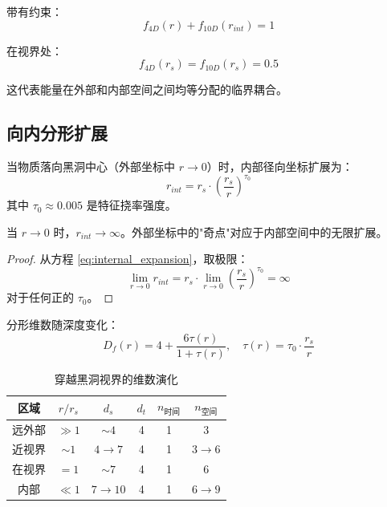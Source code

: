 带有约束：
\begin{equation}
    f_{4D}(r) + f_{10D}(r_{int}) = 1
\end{equation}

在视界处：
\begin{equation}
    f_{4D}(r_s) = f_{10D}(r_s) = 0.5
    \label{eq:horizon_energy_equipartition}
\end{equation}

这代表能量在外部和内部空间之间均等分配的临界耦合。

\subsection{向内分形扩展}

\begin{theorem}[向内分形扩展]
当物质落向黑洞中心（外部坐标中 $r \to 0$）时，内部径向坐标扩展为：
\begin{equation}
    r_{int} = r_s \cdot \left(\frac{r_s}{r}\right)^{\tau_0}
    \label{eq:internal_expansion}
\end{equation}
其中 $\tau_0 \approx 0.005$ 是特征挠率强度。
\end{theorem}

\begin{corollary}[无限内部空间]
当 $r \to 0$ 时，$r_{int} \to \infty$。外部坐标中的"奇点"对应于内部空间中的无限扩展。
\end{corollary}

\begin{proof}
从方程 \eqref{eq:internal_expansion}，取极限：
\begin{equation}
    \lim_{r \to 0} r_{int} = r_s \cdot \lim_{r \to 0} \left(\frac{r_s}{r}\right)^{\tau_0} = \infty
\end{equation}
对于任何正的 $\tau_0$。
\end{proof}

分形维数随深度变化：
\begin{equation}
    D_f(r) = 4 + \frac{6\tau(r)}{1 + \tau(r)}, \quad \tau(r) = \tau_0 \cdot \frac{r_s}{r}
\end{equation}

\begin{table}[htbp]
\centering
\caption{穿越黑洞视界的维数演化}
\begin{tabular}{@{}cccccc@{}}
\hline
区域 & $r/r_s$ & $d_s$ & $d_t$ & $n_{时间}$ & $n_{空间}$ \\
\hline
远外部 & $\gg 1$ & $\sim 4$ & 4 & 1 & 3 \\
近视界 & $\sim 1$ & $4 \to 7$ & 4 & 1 & $3 \to 6$ \\
在视界 & $= 1$ & $\sim 7$ & 4 & 1 & 6 \\
内部 & $\ll 1$ & $7 \to 10$ & 4 & 1 & $6 \to 9$ \\
\hline
\end{tabular}
\label{tab:dimensional_evolution}
\end{table}

